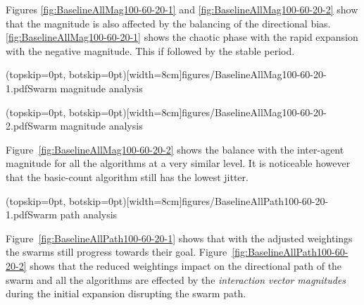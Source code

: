 \documentclass{ieeeaccess}
\begin{document}
Figures \ref{fig:BaselineAllMag100-60-20-1} and \ref{fig:BaselineAllMag100-60-20-2} show that the magnitude is also affected by the balancing of the directional bias. \ref{fig:BaselineAllMag100-60-20-1} shows the chaotic phase with the rapid expansion with the negative magnitude. This if followed by the stable period. 


\Figure[t!](topskip=0pt, botskip=0pt)[width=8cm]{figures/BaselineAllMag100-60-20-1.pdf}{Swarm magnitude analysis\label{fig:BaselineAllMag100-60-20-1}}


\Figure[t!](topskip=0pt, botskip=0pt)[width=8cm]{figures/BaselineAllMag100-60-20-2.pdf}{Swarm magnitude analysis\label{fig:BaselineAllMag100-60-20-2}}

Figure~\ref{fig:BaselineAllMag100-60-20-2} shows the balance with the inter-agent magnitude for all the algorithms at a very similar level. It is noticeable however that the basic-count algorithm still has the lowest jitter.


\Figure[t!](topskip=0pt, botskip=0pt)[width=8cm]{figures/BaselineAllPath100-60-20-1.pdf}{Swarm path analysis\label{fig:BaselineAllPath100-60-20-1}}

Figure~\ref{fig:BaselineAllPath100-60-20-1} shows that with the adjusted weightings the swarms still progress towards their goal. Figure~\ref{fig:BaselineAllPath100-60-20-2} shows that the reduced weightings impact on the directional path of the swarm and all the algorithms are effected by the \textit{interaction vector magnitudes} during the initial expansion disrupting the swarm path.
\end{document}
